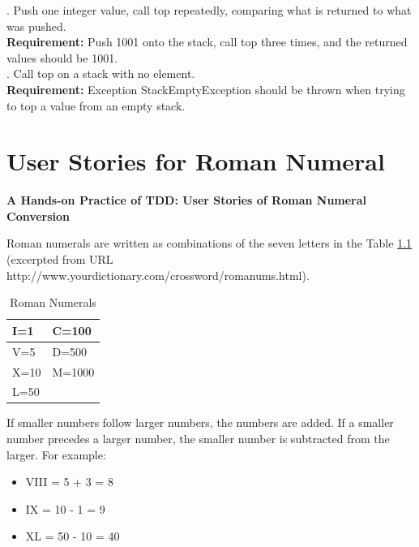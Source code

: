 . Push one integer value, call top repeatedly, comparing what is returned to what was pushed. \\
\textbf{Requirement:} Push 1001 onto the stack, call top three times, and the returned values should be 1001.\\

. Call top on a stack with no element. \\
\textbf{Requirement:} Exception StackEmptyException should be thrown when trying to top a value from an empty stack. 

\chapter{User Stories for Roman Numeral}
\label{app:UserStoriesRomanNumeral}

\clearpage
\begin{center}
\LARGE{\textbf{A Hands-on Practice of TDD: User Stories of Roman Numeral Conversion}}
\end{center}

Roman numerals are written as combinations of the seven letters in the
Table \ref{tab:AppRomanNumerals} (excerpted from URL 
http://www.yourdictionary.com/crossword/romanums.html).
\begin{table}[!h]
\centering
  \begin{tabular}{|p{2cm}|p{2cm}|}
  \hline
    I=1  & C=100  \\ \hline
    V=5  & D=500  \\ \hline
    X=10 & M=1000 \\ \hline
    L=50 &        \\ 
  \hline
  \end{tabular}
  \caption{Roman Numerals}\label{tab:AppRomanNumerals}  
\end{table}
If smaller numbers follow larger numbers, the numbers are added. If a
smaller number precedes a larger number, the smaller number is
subtracted from the larger. For example:
\begin{itemize}
\item VIII = 5 + 3 = 8
\item IX   = 10 - 1 = 9
\item XL   = 50 - 10 = 40
\end{itemize}

